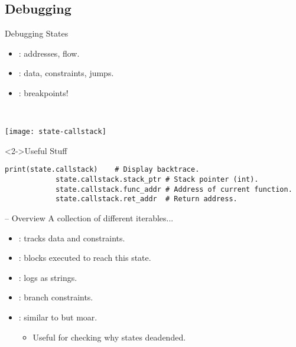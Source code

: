 \documentclass[xcolor={dvipsnames}]{beamer}
\begin{document}
\subsection{Debugging}
\begin{frame}{Debugging States}
    \begin{itemize}
        \item {}: addresses, flow.
        \item {}: data, constraints, jumps.
        \item {}: breakpoints!
    \end{itemize}
    \-\\
\end{frame}
\begin{frame}[fragile]{}
    \begin{center}
        \texttt{[image: state-callstack]}
    \end{center}
    \begin{block}<2->{Useful Stuff}
        \vskip-5pt
        \begin{lstlisting}[style=plainpy,gobble=12]
            print(state.callstack)    # Display backtrace.
            state.callstack.stack_ptr # Stack pointer (int).
            state.callstack.func_addr # Address of current function.
            state.callstack.ret_addr  # Return address.
        \end{lstlisting}
    \end{block}
\end{frame}
\begin{frame}[fragile]{ -- Overview}\label{debugging-states}
    A collection of different iterables...
    \begin{itemize}
        \item<1-> : tracks data and constraints.
        \item<2-> : blocks executed to reach this state.
        \item<2-> : logs as strings.
        \item<2-> : branch constraints.
              \vskip5pt
        \item<2-> : similar to  but moar.
              \begin{itemize}
                  \item Useful for checking why states deadended.
              \end{itemize}
    \end{itemize}
\end{frame}
\end{document}
